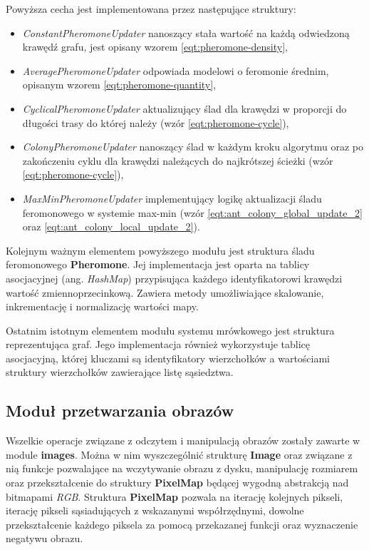 {{{            Powyższa cecha jest implementowana przez następujące struktury:

            \begin{itemize}
                \item \textit{ConstantPheromoneUpdater} nanoszący stała wartość na każdą odwiedzoną krawędź grafu, jest
                opisany wzorem \ref{eqt:pheromone-density},
                \item \textit{AveragePheromoneUpdater} odpowiada modelowi o feromonie średnim, opisanym wzorem \ref{eqt:pheromone-quantity},
                \item \textit{CyclicalPheromoneUpdater} aktualizujący ślad dla krawędzi w proporcji do długości trasy do
                której należy (wzór \ref{eqt:pheromone-cycle}),
                \item \textit{ColonyPheromoneUpdater} nanoszący ślad w każdym kroku algorytmu oraz po zakończeniu cyklu
                dla krawędzi należących do najkrótszej ścieżki (wzór \ref{eqt:pheromone-cycle}),
                \item \textit{MaxMinPheromoneUpdater} implementujący logikę aktualizacji śladu feromonowego w systemie
                max-min (wzór \ref{eqt:ant_colony_global_update_2} oraz \ref{eqt:ant_colony_local_update_2}).
            \end{itemize}

            Kolejnym ważnym elementem powyższego modułu jest struktura śladu feromonowego \textbf{Pheromone}. Jej
            implementacja jest oparta na tablicy asocjacyjnej (ang. \textit{HashMap}) przypisująca każdego
            identyfikatorowi krawędzi wartość zmiennoprzecinkową. Zawiera metody umożliwiające skalowanie,
            inkrementację i normalizację wartości mapy.

            Ostatnim istotnym elementem modułu systemu mrówkowego jest struktura reprezentująca graf. Jego implementacja
            również wykorzystuje tablicę asocjacyjną, której kluczami są identyfikatory wierzchołków a wartościami
            struktury wierzchołków zawierające listę sąsiedztwa.
        }

        \subsection{Moduł przetwarzania obrazów}
        {
            Wszelkie operacje związane z odczytem i manipulacją obrazów zostały zawarte w module \textbf{images}. Można
            w nim wyszczególnić strukturę \textbf{Image} oraz związane z nią funkcje pozwalające na wczytywanie obrazu z
            dysku, manipulację rozmiarem oraz przekształcenie do struktury \textbf{PixelMap} będącej wygodną abstrakcją
            nad bitmapami \textit{RGB}. Struktura \textbf{PixelMap} pozwala na iterację kolejnych pikseli, iterację
            pikseli sąsiadujących z wskazanymi współrzędnymi, dowolne przekształcenie każdego piksela za pomocą
            przekazanej funkcji oraz wyznaczenie negatywu obrazu.

}}}
